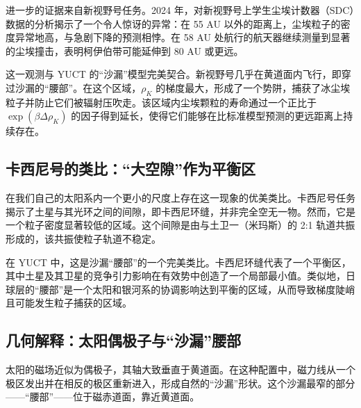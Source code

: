 \documentclass[11pt,a4paper]{article}
\theoremstyle{remark}
\begin{document}
	进一步的证据来自新视野号任务。2024 年，对新视野号上学生尘埃计数器（SDC）数据的分析揭示了一个令人惊讶的异常：在 55 AU 以外的距离上，尘埃粒子的密度异常地高，与急剧下降的预测相悖。在 58 AU 处航行的航天器继续测量到显著的尘埃撞击，表明柯伊伯带可能延伸到 80 AU 或更远。
	
	这一观测与 YUCT 的“沙漏”模型完美契合。新视野号几乎在黄道面内飞行，即穿过沙漏的“腰部”。在这个区域，\(\rho_K\) 的梯度最大，形成了一个势阱，捕获了冰尘埃粒子并防止它们被辐射压吹走。该区域内尘埃颗粒的寿命通过一个正比于 \(\exp(\beta \Delta \rho_K)\) 的因子得到延长，使得它们能够在比标准模型预测的更远距离上持续存在。
	
	\subsection{卡西尼号的类比：“大空隙”作为平衡区}
	\label{subsec:coord:cassini}
	
	在我们自己的太阳系内一个更小的尺度上存在这一现象的优美类比。卡西尼号任务揭示了土星与其光环之间的间隙，即卡西尼环缝，并非完全空无一物。然而，它是一个粒子密度显著较低的区域。这个间隙是由与土卫一（米玛斯）的 2:1 轨道共振形成的，该共振使粒子轨道不稳定。
	
	在 YUCT 中，这是沙漏“腰部”的一个完美类比。卡西尼环缝代表了一个平衡区，其中土星及其卫星的竞争引力影响在有效势中创造了一个局部最小值。类似地，日球层的“腰部”是一个太阳和银河系的协调影响达到平衡的区域，从而导致梯度陡峭且可能发生粒子捕获的区域。
	
	\subsection{几何解释：太阳偶极子与“沙漏”腰部}
	\label{subsec:coord:dipole_geometry}
	
	太阳的磁场近似为偶极子，其轴大致垂直于黄道面。在这种配置中，磁力线从一个极区发出并在相反的极区重新进入，形成自然的“沙漏”形状。这个沙漏最窄的部分——“腰部”——位于磁赤道面，靠近黄道面。
	
\end{document}
